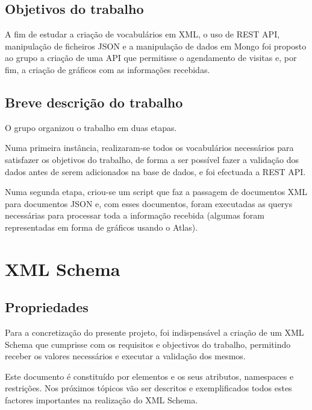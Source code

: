 \documentclass{article}
\begin{document}
\subsection{Objetivos do trabalho}
\hspace{0.5cm}A fim de estudar a criação de vocabulários em XML, o uso de REST API, manipulação de ficheiros JSON e a manipulação de dados em Mongo foi proposto ao grupo a criação de uma API que permitisse o agendamento de visitas e, por fim, a criação de gráficos com as informações recebidas. \par

\subsection{Breve descrição do trabalho}
\hspace{0.5cm}O grupo organizou o trabalho em duas etapas.\par
Numa primeira instância, realizaram-se todos os vocabulários necessários para satisfazer os objetivos do trabalho, de forma a ser possível fazer a validação dos dados antes de serem adicionados na base de dados, e foi efectuada a REST API. \par
Numa segunda etapa, criou-se um script que faz a passagem de documentos XML para documentos JSON e, com esses documentos, foram executadas as querys necessárias para processar toda a informação recebida (algumas foram representadas em forma de gráficos usando o Atlas).  \par

\newpage
\section{XML Schema}
\subsection{Propriedades}
\hspace{0.5cm} Para a concretização do presente projeto, foi indispensável a criação de um XML Schema que cumprisse com os requisitos e objectivos do trabalho, permitindo receber os valores necessários e executar a validação dos mesmos. \par
Este documento é constituído por elementos e os seus atributos, namespaces e restrições. Nos próximos tópicos vão ser descritos e exemplificados todos estes factores importantes na realização do XML Schema. 
\end{document}
